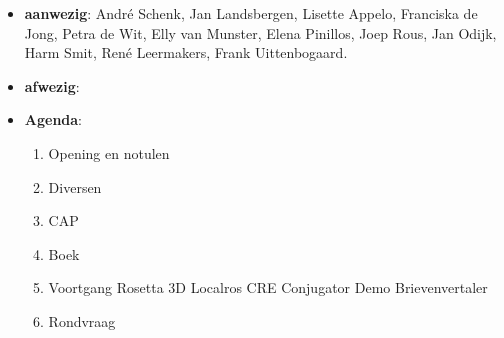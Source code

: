 
   \RosDate{\today}
   \RosSupersedes{-}
   \MakeRosTitle



\begin{itemize}
  \item {\bf aanwezig}: Andr\'{e} Schenk, Jan Landsbergen, Lisette Appelo,
                     Franciska de Jong, Petra de Wit, Elly van Munster, 
                     Elena Pinillos, Joep Rous, Jan Odijk, Harm Smit,
                     Ren\'{e} Leermakers, Frank Uittenbogaard.

  \item {\bf afwezig}: 
  \item {\bf Agenda}:
    \begin{enumerate}
       \item Opening en notulen
       \item Diversen
       \item CAP
       \item Boek
       \item Voortgang Rosetta 3D
                       Localros CRE
                       Conjugator
                       Demo Brievenvertaler
       \item Rondvraag
    \end{enumerate}
\end{itemize}

